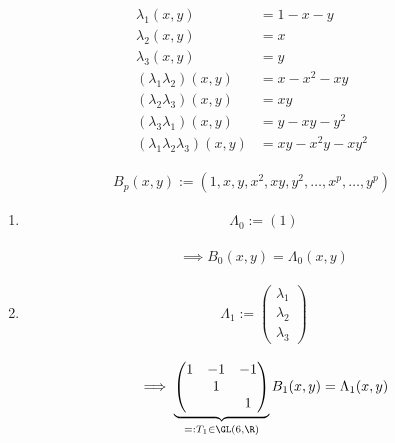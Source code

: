 
\begin{solution}

\begin{align*}
  \lambda_1(x, y) & = 1 - x - y \\
  \lambda_2(x, y) & = x \\
  \lambda_3(x, y) & = y \\
  (\lambda_1 \lambda_2)(x, y) & = x - x^2 - xy \\
  (\lambda_2 \lambda_3)(x, y) & = xy \\
  (\lambda_3 \lambda_1)(x, y) & = y - xy - y^2 \\
  (\lambda_1 \lambda_2 \lambda_3)(x, y) & = xy - x^2 y - x y^2
\end{align*}

\begin{align*}
  B_p(x, y) := (1, x, y, x^2, xy, y^2, \dots, x^p, \dots, y^p)
\end{align*}

\begin{enumerate}[label = \textbf{\alph*)}]

  \item

  \begin{align*}
    \Lambda_0 := (1)
  \end{align*}

  \begin{align*}
    \implies
    B_0(x, y) = \Lambda_0(x, y)
  \end{align*}
  
  \item

  \begin{align*}
    \Lambda_1
    :=
    \begin{pmatrix}
      \lambda_1 \\
      \lambda_2 \\
      \lambda_3
    \end{pmatrix}
  \end{align*}

  \begin{align*}
    \implies
    \underbrace
    {
      \begin{pmatrix}
        1 & -1 & -1 \\
          &  1 &    \\
          &    &  1
      \end{pmatrix}
    }_{
      =: T_1 \in \GL(6, \R)
    }
    B_1(x, y)
    =
    \Lambda_1(x, y)
  \end{align*}


\end{enumerate}
\end{solution}
